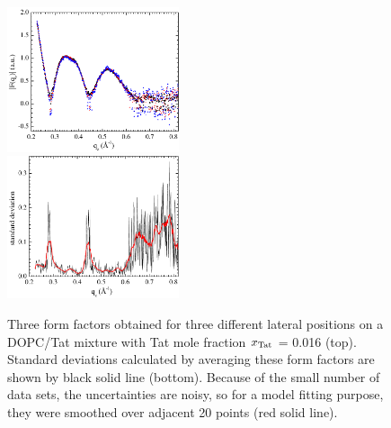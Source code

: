 \begin{figure}[htbp]
  \centering
  \includegraphics[width=0.45\textwidth]{figures/Tat/NFIT_results/three_form_factors}
  \\
  \includegraphics[width=0.45\textwidth]{figures/Tat/NFIT_results/standard_deviation}
  \caption[Three form factors obtained for three different lateral positions
  on a DOPC/Tat mixture with Tat mole fraction $\xTat$ = 0.016 (top)]
  {Three form factors obtained for three different lateral positions
  on a DOPC/Tat mixture with Tat mole fraction $\xTat$ = 0.016 (top).
  Standard deviations calculated by averaging these form factors are shown
  by black solid line (bottom). Because of the small number of data sets, the 
  uncertainties are noisy, so for a model fitting purpose, they were smoothed
  over adjacent 20 points (red solid line).}
  \label{fig:form_factor_uncertainty}
\end{figure}

